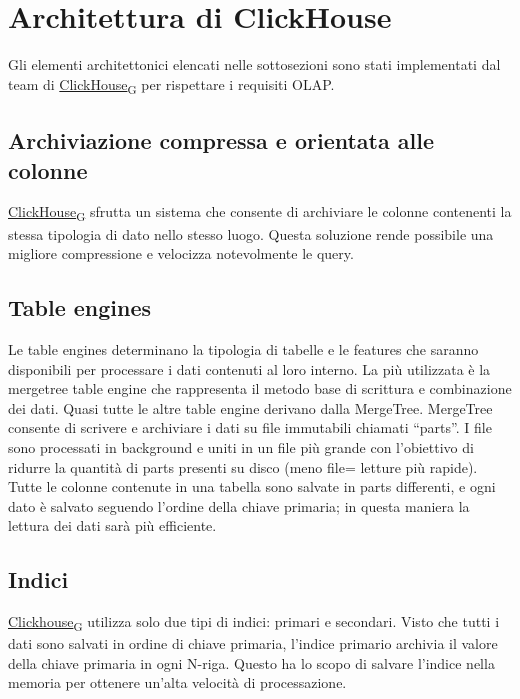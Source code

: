 \section{Architettura di ClickHouse}
Gli elementi architettonici elencati nelle sottosezioni sono stati implementati dal team di \href{https://7last.github.io/docs/pb/documentazione-interna/glossario\#clickhouse}{ClickHouse\textsubscript{G}} per rispettare i requisiti OLAP. 
\subsection{Archiviazione compressa e orientata alle colonne}
\href{https://7last.github.io/docs/pb/documentazione-interna/glossario\#clickhouse}{ClickHouse\textsubscript{G}} sfrutta un sistema che consente di archiviare le colonne contenenti la stessa tipologia di dato nello stesso luogo. Questa soluzione rende possibile una migliore compressione e velocizza notevolmente le query.


\subsection{Table engines}
Le table engines determinano la tipologia di tabelle e le features che saranno disponibili per processare i dati contenuti al loro interno.
La più utilizzata è la mergetree table engine che rappresenta il metodo base di scrittura e combinazione dei dati. Quasi tutte le altre table engine derivano dalla MergeTree. 
MergeTree consente di scrivere e archiviare i dati su file immutabili chiamati “parts”. I file sono processati in background e uniti in un file più grande con l’obiettivo di ridurre la quantità di parts presenti su disco (meno file= letture più rapide).
Tutte le colonne contenute in una tabella sono salvate in parts differenti, e ogni dato è salvato seguendo l’ordine della chiave primaria; in questa maniera la lettura dei dati sarà più efficiente.


\subsection{Indici}
\href{https://7last.github.io/docs/pb/documentazione-interna/glossario\#clickhouse}{Clickhouse\textsubscript{G}} utilizza solo due tipi di indici: primari e secondari.
Visto che tutti i dati sono salvati in ordine di chiave primaria, l’indice primario archivia il valore della chiave primaria in ogni N-riga. Questo ha lo scopo di salvare l’indice nella memoria per ottenere un’alta velocità di processazione. 


